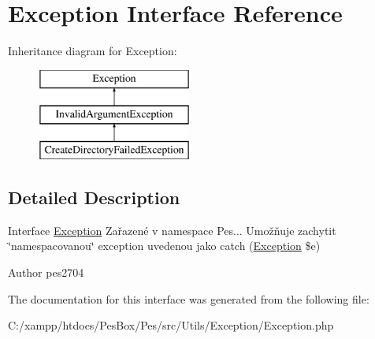 \hypertarget{interface_pes_1_1_utils_1_1_exception_1_1_exception}{}\section{Exception Interface Reference}
\label{interface_pes_1_1_utils_1_1_exception_1_1_exception}
Inheritance diagram for Exception\+:\begin{figure}[H]
\begin{center}
\leavevmode
\includegraphics[height=3.000000cm]{interface_pes_1_1_utils_1_1_exception_1_1_exception}
\end{center}
\end{figure}


\subsection{Detailed Description}
Interface \mbox{\hyperlink{interface_pes_1_1_utils_1_1_exception_1_1_exception}{Exception}} Zařazené v namespace Pes... Umožňuje zachytit \char`\"{}namespacovanou\char`\"{} exception uvedenou jako catch (\mbox{\hyperlink{interface_pes_1_1_utils_1_1_exception_1_1_exception}{Exception}} \$e)

\begin{DoxyAuthor}{Author}
pes2704 
\end{DoxyAuthor}


The documentation for this interface was generated from the following file\+:\begin{DoxyCompactItemize}
\item 
C\+:/xampp/htdocs/\+Pes\+Box/\+Pes/src/\+Utils/\+Exception/Exception.\+php\end{DoxyCompactItemize}
